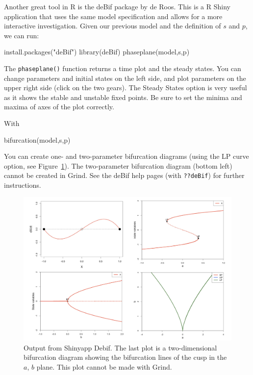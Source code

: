 \documentclass[
  a4paper,
  DIV=11,
  numbers=noendperiod,
  oneside]{scrreprt}
\newenvironment{Shaded}{\begin{snugshade}}{\end{snugshade}}
\newcommand{\FunctionTok}[1]{\textcolor[rgb]{0.28,0.35,0.67}{#1}}
\newcommand{\NormalTok}[1]{\textcolor[rgb]{0.00,0.23,0.31}{#1}}
\newcommand{\StringTok}[1]{\textcolor[rgb]{0.13,0.47,0.30}{#1}}
\begin{document}
Another great tool in R is the deBif package by de Roos. This is a R
Shiny application that uses the same model specification and allows for
a more interactive investigation. Given our previous model and the
definition of \(s\) and \(p\), we can run:

\begin{Shaded}
\begin{Highlighting}[]
\FunctionTok{install.packages}\NormalTok{(}\StringTok{"deBif"}\NormalTok{)}
\FunctionTok{library}\NormalTok{(deBif)}
\FunctionTok{phaseplane}\NormalTok{(model,s,p)}
\end{Highlighting}
\end{Shaded}

The \texttt{phaseplane()} function returns a time plot and the steady
states. You can change parameters and initial states on the left side,
and plot parameters on the upper right side (click on the two gears).
The Steady States option is very useful as it shows the stable and
unstable fixed points. Be sure to set the minima and maxima of axes of
the plot correctly.

With

\begin{Shaded}
\begin{Highlighting}[]
\FunctionTok{bifurcation}\NormalTok{(model,s,p)}
\end{Highlighting}
\end{Shaded}

You can create one- and two-parameter bifurcation diagrams (using the LP
curve option, see Figure~\ref{fig-ch4n-img4-old-52}). The two-parameter
bifurcation diagram (bottom left) cannot be created in Grind. See the
deBif help pages (with \texttt{??deBif}) for further instructions.

\begin{figure}

{\centering \includegraphics{media/ch4n/image4.jpg}

}

\caption{\label{fig-ch4n-img4-old-52}Output from Shinyapp Debif. The
last plot is a two-dimensional bifurcation diagram showing the
bifurcation lines of the cusp in the \(a\), \(b\) plane. This plot
cannot be made with Grind.}

\end{figure}
\end{document}
